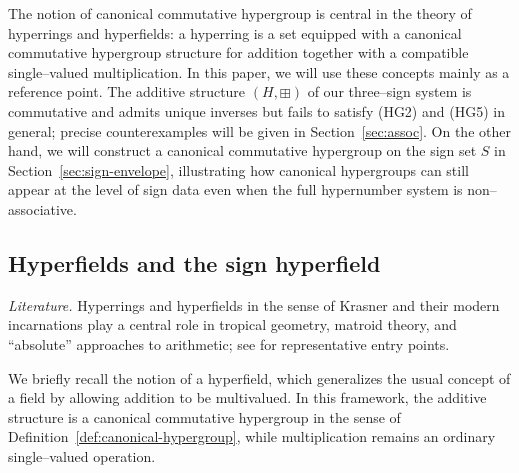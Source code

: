 \documentclass[11pt]{amsart}
\numberwithin{equation}{section}
\theoremstyle{definition}
\theoremstyle{remark}
\newcommand{\Hnum}{H}                      %
\newcommand{\Sset}{S}                      %
\newcommand{\op}{\boxplus}                 %
\begin{document}
The notion of canonical commutative hypergroup is central in the
theory of hyperrings and hyperfields: a hyperring is a set equipped
with a canonical commutative hypergroup structure for addition
together with a compatible single--valued multiplication.  In this
paper, we will use these concepts mainly as a reference point.  The
additive structure $(\Hnum,\op)$ of our three--sign system is
commutative and admits unique inverses but fails to satisfy (HG2) and
(HG5) in general; precise counterexamples will be given in
Section~\ref{sec:assoc}.  On the other hand, we will construct a
canonical commutative hypergroup on the sign set $\Sset$ in
Section~\ref{sec:sign-envelope}, illustrating how canonical
hypergroups can still appear at the level of sign data even when the
full hypernumber system is non--associative.

\subsection{Hyperfields and the sign hyperfield}
\label{subsec:hyperfields}

\noindent
\emph{Literature.}  Hyperrings and hyperfields in the sense of Krasner and their
modern incarnations play a central role in tropical geometry, matroid theory,
and ``absolute'' approaches to arithmetic; see
\cite{Viro2010Hyperfields,ConnesConsani2010Monoids,Jun2021GeometryHyperfields,BakerBowler2019MatroidsHyperfields,Lorscheid2022TropicalHyperfield}
for representative entry points.

We briefly recall the notion of a hyperfield, which generalizes the
usual concept of a field by allowing addition to be multivalued.  In
this framework, the additive structure is a canonical commutative
hypergroup in the sense of Definition~\ref{def:canonical-hypergroup},
while multiplication remains an ordinary single–valued operation.
\end{document}

